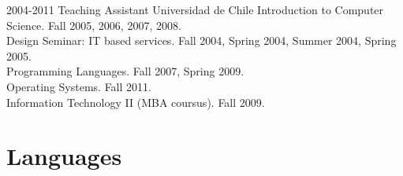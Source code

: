 \documentclass[10pt,a4paper,sans]{moderncv}
\newif\iffullversion
\begin{document}
\cventry
{2004-2011}
{Teaching Assistant}
{Universidad de Chile}
{}
{}
{
Introduction to Computer Science. Fall 2005, 2006, 2007, 2008.\\
Design Seminar: IT based services. Fall 2004, Spring 2004, Summer 2004, Spring 2005.\\
Programming Languages. Fall 2007, Spring 2009.\\
Operating Systems. Fall 2011.\\
Information Technology II (MBA coursus). Fall 2009.\\
}

\fi
\iffullversion

\section{Awards and Scholarship}
\cvitem{2016}{Prix de thèse Fondation ISAE-SUPAERO 2016}
\cvitem{2010}{Government Scholarship ``Becas Chile'' to fulfill a 4 years PhD outside of Chile}
\cvitem{2010}{Best Graduated Student, Computer Science Department, University of Chile}
\cvitem{2009}{Master thesis partially funded by Fondecyt (Chile) Grant 11060493: ``Modularization and Adaptation of Complex and Dynamic Software Systems''.}
\cvitem{2008}{Master student scholarship Universidad de Chile}
\cvitem{2007}{Master student internship scholarship at Vrije Universiteit Brussels, Belgium}
\cvitem{2006-2007}{Outstanding Student Award, School of Engineering and Sciences, University of Chile.}


\section{Leadership and Social Work}
\cvitem{2007}{President of Computer Science Alumni group. Universidad de Chile}
\cvitem{2007--2008}{Summer volunteer professor of maths and computer science at ``Jornadas Científico-Humanistas''. Ancud, Chile}
\cvitem{1998--2001}{Chilean Linux User Group, Chile}

\fi
\section{Languages}

\end{document}
